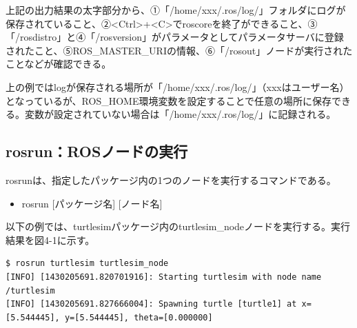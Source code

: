 上記の出力結果の太字部分から、①「/home/xxx/.ros/log/」フォルダにログが保存されていること、②<Ctrl>+<C>でroscoreを終了ができること、③「/rosdistro」と④「/rosversion」がパラメータとしてパラメータサーバに登録されたこと、⑤ROS\_MASTER\_URIの情報、⑥「/rosout」ノードが実行されたことなどが確認できる。

\begin{exercise}[ログの保存場所]
上の例ではlogが保存される場所が「/home/xxx/.ros/log/」（xxxはユーザー名）となっているが、ROS\_HOME環境変数を設定することで任意の場所に保存できる。変数が設定されていない場合は「/home/xxx/.ros/log/」に記録される。
\end{exercise}

\subsection{rosrun：ROSノードの実行}

rosrunは、指定したパッケージ内の1つのノードを実行するコマンドである。

\begin{itemize}
\item   rosrun [パッケージ名] [ノード名]
\end{itemize}

以下の例では、turtlesimパッケージ内のturtlesim\_nodeノードを実行する。実行結果を図4-1に示す。

\begin{lstlisting}[language=ROS]
$ rosrun turtlesim turtlesim_node
[INFO] [1430205691.820701916]: Starting turtlesim with node name /turtlesim
[INFO] [1430205691.827666004]: Spawning turtle [turtle1] at x=[5.544445], y=[5.544445], theta=[0.000000]
\end{lstlisting}

